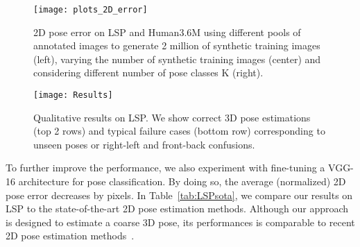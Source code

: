 \documentclass{article}
\begin{document}
 \begin{figure}[htb]
   \centering 
  \hspace{-0mm}\texttt{[image: plots\_2D\_error]}
\vspace{-5mm}  \caption{\footnotesize  2D pose error on LSP and
  Human3.6M using different pools of annotated images to generate 2
  million of synthetic training images (left), varying the number of
  synthetic training images (center) and considering different number of pose classes K (right).}
     \label{fig:plots}
 \end{figure} 
















   








\begin{figure}[t]
\vspace{-2mm}
   \centering 
  \hspace{-0mm}\texttt{[image: Results]}
  \vspace{-3mm} \caption{\footnotesize Qualitative results on LSP. We show correct 3D pose estimations (top 2 rows) and typical failure cases (bottom row) corresponding to unseen poses or right-left and front-back confusions.}
 
     \label{fig:results}
 \end{figure}


To further improve the performance, we also experiment with fine-tuning a VGG-16 architecture \cite{SimonyanZ14a} for pose classification. By doing so, the average (normalized) 2D pose error decreases by  pixels.
In Table~\ref{tab:LSPsota}, we compare our results on LSP to the
state-of-the-art 2D pose estimation methods. Although our
approach is designed to estimate a coarse 3D pose, its performances is
comparable to recent 2D pose
estimation methods~\cite{ChenY14,yang2016end}. 
 
\end{document}
